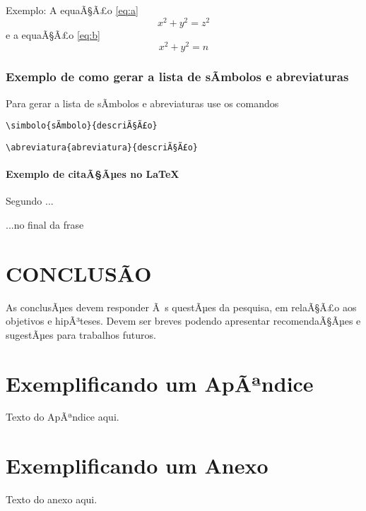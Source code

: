 \documentclass{ufscThesis} %
\begin{document}
Exemplo: A equaÃ§Ã£o \ref{eq:a}
\begin{equation}
 x^2 + y^2 = z^2
 \label{eq:a}
\end{equation}
 e a equaÃ§Ã£o  \ref{eq:b}
\begin{equation}
 x^2 + y^2 = n
\label{eq:b}
\end{equation}

\subsection{Exemplo de como gerar a lista de sÃ­mbolos e abreviaturas}

Para gerar a lista de sÃ­mbolos e abreviaturas use os comandos


\begin{lstlisting}
\simbolo{sÃ­mbolo}{descriÃ§Ã£o}
\end{lstlisting}

\begin{lstlisting}
\abreviatura{abreviatura}{descriÃ§Ã£o}
\end{lstlisting}

\subsubsection{Exemplo de citaÃ§Ãµes no \LaTeX}

Segundo  ...

...no final da frase \cite{abnt14724,BU_formatoA5}


\nocite{alves_2001,abnt10520,abnt6024,abnt14724}



\chapter{CONCLUSÃO}

As conclusÃµes devem responder Ã s questÃµes da pesquisa, em relaÃ§Ã£o aos objetivos e hipÃ³teses. Devem ser breves podendo apresentar recomendaÃ§Ãµes e sugestÃµes para trabalhos futuros.




\apendice
\chapter{Exemplificando um ApÃªndice}
Texto do ApÃªndice aqui. 

\anexo
\chapter{Exemplificando um Anexo}
Texto do anexo aqui.
\end{document}

